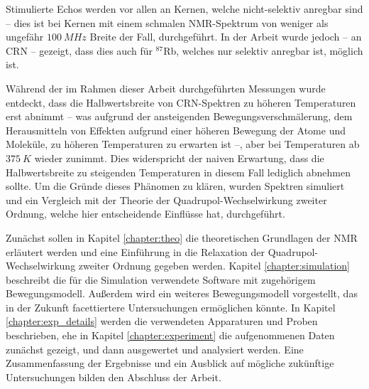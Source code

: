 Stimulierte Echos werden vor allen an Kernen, welche nicht-selektiv anregbar sind -- dies ist bei Kernen mit einem schmalen NMR-Spektrum von weniger als ungefähr $\SI{100}{MHz}$ Breite der Fall, durchgeführt. In der Arbeit \cite{joachim_master} wurde jedoch -- an CRN -- gezeigt, dass dies auch für $^\text{87}$Rb, welches nur selektiv anregbar ist, möglich ist.

Während der im Rahmen dieser Arbeit durchgeführten Messungen wurde entdeckt, dass die Halbwertsbreite von CRN-Spektren zu höheren Temperaturen erst abnimmt -- was aufgrund der ansteigenden Bewegungsverschmälerung, dem Herausmitteln von Effekten aufgrund einer höheren Bewegung der Atome und Moleküle, zu höheren Temperaturen zu erwarten ist --, aber bei Temperaturen ab $\SI{375}{K}$ wieder zunimmt. Dies widerspricht der naiven Erwartung, dass die Halbwertsbreite zu steigenden Temperaturen in diesem Fall lediglich abnehmen sollte. Um die Gründe dieses Phänomen zu klären, wurden Spektren simuliert und ein Vergleich mit der Theorie der Quadrupol-Wechselwirkung zweiter Ordnung, welche hier entscheidende Einflüsse hat, durchgeführt.

Zunächst sollen in Kapitel \ref{chapter:theo} die theoretischen Grundlagen der NMR erläutert werden und eine Einführung in die Relaxation der Quadrupol-Wechselwirkung zweiter Ordnung gegeben werden. Kapitel \ref{chapter:simulation} beschreibt die für die Simulation verwendete Software mit zugehörigem Bewegungsmodell. Außerdem wird ein weiteres Bewegungsmodell vorgestellt, das in der Zukunft facettiertere Untersuchungen ermöglichen könnte. In Kapitel \ref{chapter:exp_details} werden die verwendeten Apparaturen und Proben beschrieben, ehe in Kapitel \ref{chapter:experiment} die aufgenommenen Daten zunächst gezeigt, und dann ausgewertet und analysiert werden. Eine Zusammenfassung der Ergebnisse und ein Ausblick auf mögliche zukünftige Untersuchungen bilden den Abschluss der Arbeit.
